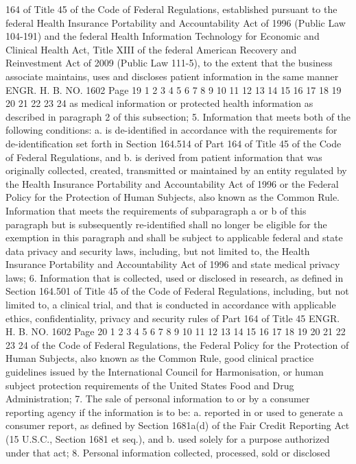 164 of Title 45 of the Code of Federal Regulations, established
pursuant to the federal Health Insurance Portability and
Accountability Act of 1996 (Public Law 104-191) and the federal
Health Information Technology for Economic and Clinical Health Act,
Title XIII of the federal American Recovery and Reinvestment Act of
2009 (Public Law 111-5), to the extent that the business associate
maintains, uses and discloses patient information in the same manner 
ENGR. H. B. NO. 1602 Page 19
1
2
3
4
5
6
7
8
9
10
11
12
13
14
15
16
17
18
19
20
21
22
23
24
as medical information or protected health information as described
in paragraph 2 of this subsection;
5. Information that meets both of the following conditions:
a. is de-identified in accordance with the requirements
for de-identification set forth in Section 164.514 of
Part 164 of Title 45 of the Code of Federal
Regulations, and
b. is derived from patient information that was
originally collected, created, transmitted or
maintained by an entity regulated by the Health
Insurance Portability and Accountability Act of 1996
or the Federal Policy for the Protection of Human
Subjects, also known as the Common Rule.
Information that meets the requirements of subparagraph a or b
of this paragraph but is subsequently re-identified shall no longer
be eligible for the exemption in this paragraph and shall be subject
to applicable federal and state data privacy and security laws,
including, but not limited to, the Health Insurance Portability and
Accountability Act of 1996 and state medical privacy laws;
6. Information that is collected, used or disclosed in
research, as defined in Section 164.501 of Title 45 of the Code of
Federal Regulations, including, but not limited to, a clinical
trial, and that is conducted in accordance with applicable ethics,
confidentiality, privacy and security rules of Part 164 of Title 45 
ENGR. H. B. NO. 1602 Page 20
1
2
3
4
5
6
7
8
9
10
11
12
13
14
15
16
17
18
19
20
21
22
23
24
of the Code of Federal Regulations, the Federal Policy for the
Protection of Human Subjects, also known as the Common Rule, good
clinical practice guidelines issued by the International Council for
Harmonisation, or human subject protection requirements of the
United States Food and Drug Administration;
7. The sale of personal information to or by a consumer
reporting agency if the information is to be:
a. reported in or used to generate a consumer report, as
defined by Section 1681a(d) of the Fair Credit
Reporting Act (15 U.S.C., Section 1681 et seq.), and
b. used solely for a purpose authorized under that act;
8. Personal information collected, processed, sold or disclosed

